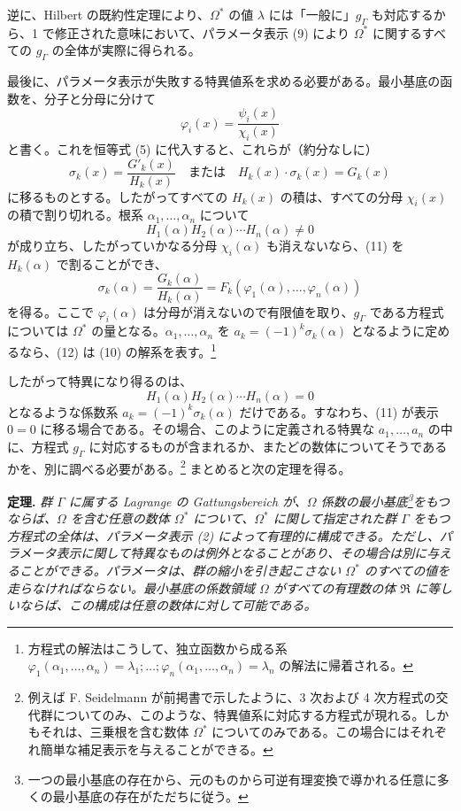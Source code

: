 \documentclass[11pt]{article}
\begin{document}
逆に、Hilbert の既約性定理により、$\Omega^*$ の値 $\lambda$ には「一般に」$g_\Gamma$ も対応するから、1 で修正された意味において、パラメータ表示 (9) により $\Omega^*$ に関するすべての $g_\Gamma$ の全体が実際に得られる。

最後に、パラメータ表示が失敗する特異値系を求める必要がある。最小基底の函数を、分子と分母に分けて
\[
\varphi_i(x)=\frac{\psi_i(x)}{\chi_i(x)}
\]
と書く。これを恒等式 (5) に代入すると、これらが（約分なしに）
\begin{equation}\tag{11}
\sigma_k(x)=\frac{G'_k(x)}{H_k(x)}\quad\text{または}\quad H_k(x)\cdot\sigma_k(x)=G_k(x)
\end{equation}
に移るものとする。したがってすべての $H_k(x)$ の積は、すべての分母 $\chi_i(x)$ の積で割り切れる。根系 $\alpha_1,
\ldots,\alpha_n$ について
\[
H_1(\alpha)H_2(\alpha)\cdots H_n(\alpha)\ne0
\]
が成り立ち、したがっていかなる分母 $\chi_i(\alpha)$ も消えないなら、(11) を $H_k(\alpha)$ で割ることができ、
\begin{equation}\tag{12}
\sigma_k(\alpha)=\frac{G_k(\alpha)}{H_k(\alpha)}=F_k(\varphi_1(\alpha),\ldots,\varphi_n(\alpha))
\end{equation}
を得る。ここで $\varphi_i(\alpha)$ は分母が消えないので有限値を取り、$g_\Gamma$ である方程式については $\Omega^*$ の量となる。$\alpha_1,
\ldots,\alpha_n$ を $a_k=(-1)^k\sigma_k(\alpha)$ となるように定めるなら、(12) は (10) の解系を表す。\footnote{方程式の解法はこうして、独立函数から成る系
$\varphi_1(\alpha_1,
\ldots,\alpha_n)=\lambda_1;\ldots;\varphi_n(\alpha_1,
\ldots,\alpha_n)=\lambda_n$
の解法に帰着される。}

したがって特異になり得るのは、
\[
H_1(\alpha)H_2(\alpha)\cdots H_n(\alpha)=0
\]
となるような係数系 $a_k=(-1)^k\sigma_k(\alpha)$ だけである。すなわち、(11) が表示 $0=0$ に移る場合である。その場合、このように定義される特異な $a_1,
\ldots,a_n$ の中に、方程式 $g_\Gamma$ に対応するものが含まれるか、またどの数体についてそうであるかを、別に調べる必要がある。\footnote{例えば F. Seidelmann が前掲書で示したように、3 次および 4 次方程式の交代群についてのみ、このような、特異値系に対応する方程式が現れる。しかもそれは、三乗根を含む数体 $\Omega^*$ についてのみである。この場合にはそれぞれ簡単な補足表示を与えることができる。} まとめると次の定理を得る。

\smallskip
\noindent\textbf{定理.} \emph{群 $\Gamma$ に属する Lagrange の \emph{Gattungsbereich} が、$\Omega$ 係数の最小基底\footnote{一つの最小基底の存在から、元のものから可逆有理変換で導かれる任意に多くの最小基底の存在がただちに従う。}をもつならば、$\Omega$ を含む任意の数体 $\Omega^*$ について、$\Omega^*$ に関して指定された群 $\Gamma$ をもつ方程式の全体は、パラメータ表示 (2) によって有理的に構成できる。ただし、パラメータ表示に関して特異なものは例外となることがあり、その場合は別に与えることができる。パラメータは、群の縮小を引き起こさない $\Omega^*$ のすべての値を走らなければならない。最小基底の係数領域 $\Omega$ がすべての有理数の体 $\mathfrak R$ に等しいならば、この構成は任意の数体に対して可能である。}
\end{document}
